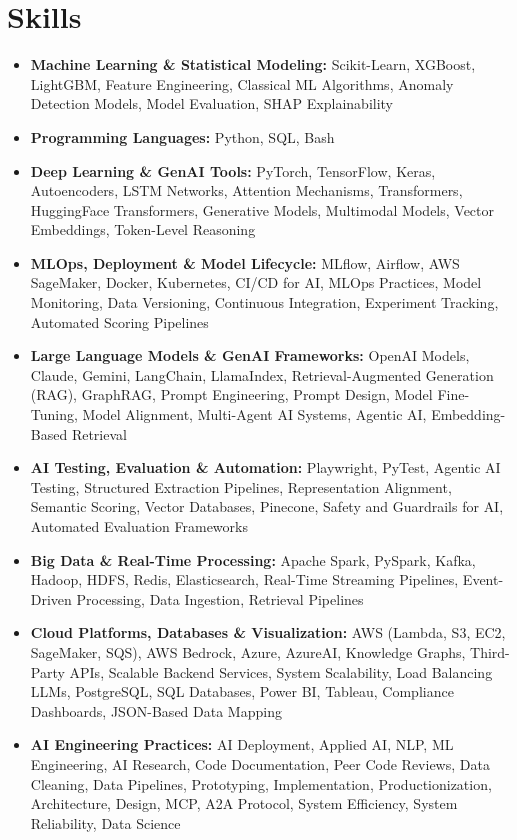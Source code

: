 \documentclass[letterpaper,11pt]{article}
\begin{document}
\section{Skills}
\vspace{-4pt}
\begin{itemize}[leftmargin=0in, label={}, itemsep=1pt, topsep=2pt, parsep=0pt]
  \item \small{\textbf{Machine Learning \& Statistical Modeling:} Scikit-Learn, XGBoost, LightGBM, Feature Engineering, Classical ML Algorithms, Anomaly Detection Models, Model Evaluation, SHAP Explainability}
  \item \small{\textbf{Programming Languages:} Python, SQL, Bash}
  \item \small{\textbf{Deep Learning \& GenAI Tools:} PyTorch, TensorFlow, Keras, Autoencoders, LSTM Networks, Attention Mechanisms, Transformers, HuggingFace Transformers, Generative Models, Multimodal Models, Vector Embeddings, Token-Level Reasoning}
  \item \small{\textbf{MLOps, Deployment \& Model Lifecycle:} MLflow, Airflow, AWS SageMaker, Docker, Kubernetes, CI/CD for AI, MLOps Practices, Model Monitoring, Data Versioning, Continuous Integration, Experiment Tracking, Automated Scoring Pipelines}
  \item \small{\textbf{Large Language Models \& GenAI Frameworks:} OpenAI Models, Claude, Gemini, LangChain, LlamaIndex, Retrieval-Augmented Generation (RAG), GraphRAG, Prompt Engineering, Prompt Design, Model Fine-Tuning, Model Alignment, Multi-Agent AI Systems, Agentic AI, Embedding-Based Retrieval}
  \item \small{\textbf{AI Testing, Evaluation \& Automation:} Playwright, PyTest, Agentic AI Testing, Structured Extraction Pipelines, Representation Alignment, Semantic Scoring, Vector Databases, Pinecone, Safety and Guardrails for AI, Automated Evaluation Frameworks}
  \item \small{\textbf{Big Data \& Real-Time Processing:} Apache Spark, PySpark, Kafka, Hadoop, HDFS, Redis, Elasticsearch, Real-Time Streaming Pipelines, Event-Driven Processing, Data Ingestion, Retrieval Pipelines}
  \item \small{\textbf{Cloud Platforms, Databases \& Visualization:} AWS (Lambda, S3, EC2, SageMaker, SQS), AWS Bedrock, Azure, AzureAI, Knowledge Graphs, Third-Party APIs, Scalable Backend Services, System Scalability, Load Balancing LLMs, PostgreSQL, SQL Databases, Power BI, Tableau, Compliance Dashboards, JSON-Based Data Mapping}
  \item \small{\textbf{AI Engineering Practices:} AI Deployment, Applied AI, NLP, ML Engineering, AI Research, Code Documentation, Peer Code Reviews, Data Cleaning, Data Pipelines, Prototyping, Implementation, Productionization, Architecture, Design, MCP, A2A Protocol, System Efficiency, System Reliability, Data Science}
\end{itemize}
\end{document}

